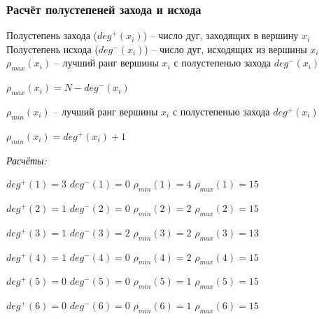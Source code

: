 \documentclass[14pt,fleqn]{extarticle}
\begin{document}
	\subsubsection*{Расчёт полустепеней захода и исхода}
	Полустепень захода ($deg^+(x_i)$) -- число дуг, заходящих в вершину $x_i$\\
	Полустепень исхода ($deg^-(x_i)$) -- число дуг, исходящих из вершины $x_i$\\
	
	$\rho_{max}(x_i)$ -- лучший ранг вершины $x_i$ с полустепенью захода $deg^-(x_i)$
	\begin{center}
		$\rho_{max}(x_i) = N - deg^-(x_i)$
	\end{center}
	$\rho_{min}(x_i)$ -- лучший ранг вершины $x_i$ с полустепенью захода $deg^+(x_i)$
	\begin{center}
		$\rho_{min}(x_i) = deg^+(x_i) + 1$
	\end{center}

	\textit{Расчёты:}
	
	$deg^+(1) = 3$ \hspace{0.55cm} $deg^-(1) = 0$ \hspace{0.55cm} $\rho_{min}(1) = 4$ \hspace{0.55cm} $\rho_{max}(1) = 15$

	$deg^+(2) = 1$ \hspace{0.55cm} $deg^-(2) = 0$ \hspace{0.55cm} $\rho_{min}(2) = 2$ \hspace{0.55cm} $\rho_{max}(2) = 15$
	
	$deg^+(3) = 1$ \hspace{0.55cm} $deg^-(3) = 2$ \hspace{0.55cm} $\rho_{min}(3) = 2$ \hspace{0.55cm} $\rho_{max}(3) = 13$
	
	$deg^+(4) = 1$ \hspace{0.55cm} $deg^-(4) = 0$ \hspace{0.55cm} $\rho_{min}(4) = 2$ \hspace{0.55cm} $\rho_{max}(4) = 15$
	
	$deg^+(5) = 0$ \hspace{0.55cm} $deg^-(5) = 0$ \hspace{0.55cm} $\rho_{min}(5) = 1$ \hspace{0.55cm} $\rho_{max}(5) = 15$
	
	$deg^+(6) = 0$ \hspace{0.55cm} $deg^-(6) = 0$ \hspace{0.55cm} $\rho_{min}(6) = 1$ \hspace{0.55cm} $\rho_{max}(6) = 15$
	
\end{document}
